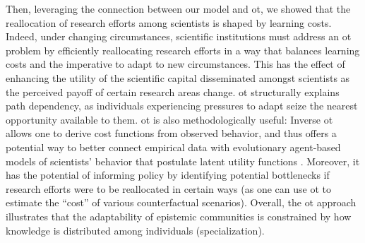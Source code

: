 \documentclass{article}
\begin{document}
Then, leveraging the connection between our model and \gls{ot}, we showed that the reallocation of research efforts among scientists is shaped by learning costs. Indeed, under changing circumstances, scientific institutions must address an \gls{ot} problem by efficiently reallocating research efforts in a way that balances learning costs and the imperative to adapt to new circumstances. This has the effect of enhancing the utility of the scientific capital disseminated amongst scientists as the perceived payoff of certain research areas change. \gls{ot} structurally explains path dependency, as individuals experiencing pressures to adapt seize the nearest opportunity available to them. \gls{ot} is also methodologically useful: Inverse \gls{ot} allows one to derive cost functions from observed behavior, and thus offers a potential way to better connect empirical data with evolutionary agent-based models of scientists' behavior that postulate latent utility functions \citep{Wu2023}. Moreover, it has the potential of informing policy by identifying potential bottlenecks if research efforts were to be reallocated in certain ways (as one can use \gls{ot} to estimate the ``cost'' of various counterfactual scenarios). Overall, the \gls{ot} approach illustrates that the adaptability of epistemic communities is constrained by how knowledge is distributed among individuals (specialization).
\end{document}
